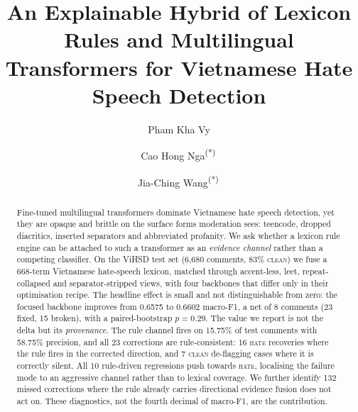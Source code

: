 \documentclass[runningheads]{llncs}
\newcommand{\hate}{\textsc{hate}}
\newcommand{\clean}{\textsc{clean}}
\begin{document}
\title{An Explainable Hybrid of Lexicon Rules and Multilingual
       Transformers for Vietnamese Hate Speech Detection}

\author{
Pham Kha Vy%
 \and
Cao Hong Nga\textsuperscript{(*)}\,
\and
Jia-Ching Wang\textsuperscript{(*)}\,
}


\maketitle

\begin{abstract}
Fine-tuned multilingual transformers dominate Vietnamese hate speech detection,
yet they are opaque and brittle on the surface forms moderation sees: teencode,
dropped diacritics, inserted separators and abbreviated profanity.  We ask whether
a lexicon rule engine can be attached to such a transformer as an \emph{evidence
channel} rather than a competing classifier.  On the ViHSD test set (6{,}680
comments, 83\% \clean) we fuse a 668-term Vietnamese hate-speech lexicon, matched
through accent-less, leet, repeat-collapsed and separator-stripped views, with
four backbones that differ only in their optimisation recipe.  The headline effect
is small and not distinguishable from zero: the focused backbone improves from
0.6575 to 0.6602 macro-F1, a net of 8 comments (23 fixed, 15 broken),
with a paired-bootstrap $p=0.29$.  The value we report is not the delta but its
\emph{provenance}.  The rule channel fires on 15.75\% of test comments with
58.75\% precision, and all 23 corrections are rule-consistent: 16 \hate{}
recoveries where the rule fires in the corrected direction, and 7 \clean{}
de-flagging cases where it is correctly silent.  All 10 rule-driven regressions
push towards \hate{}, localising the failure mode to an aggressive channel rather
than to lexical coverage.  We further identify 132 missed corrections where the
rule already carries directional evidence fusion does not act on.  These
diagnostics, not the fourth decimal of macro-F1, are the contribution.
\end{abstract}
\end{document}
